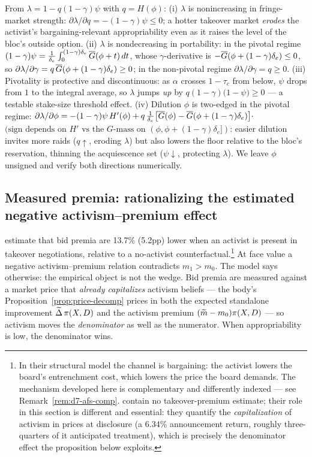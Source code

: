 \begin{remark}
\label{rem:d7-compstat}
From $\lambda=1-q(1-\gamma)\psi$ with $q=H(\phi)$:
(i) $\lambda$ is nonincreasing in fringe-market strength: $\partial\lambda/\partial q=-(1-\gamma)\psi\le0$; a hotter takeover market \emph{erodes} the activist's bargaining-relevant appropriability even as it raises the level of the bloc's outside option.
(ii) $\lambda$ is nondecreasing in portability: in the pivotal regime $(1-\gamma)\psi=\frac{1}{\delta_{e}}\int_{0}^{(1-\gamma)\delta_{e}}\overline{G}(\phi+t)\,dt$, whose $\gamma$-derivative is $-\overline{G}(\phi+(1-\gamma)\delta_{e})\le0$, so $\partial\lambda/\partial\gamma=q\,\overline{G}(\phi+(1-\gamma)\delta_{e})\ge0$; in the non-pivotal regime $\partial\lambda/\partial\gamma=q\ge0$.
(iii) Pivotality is protective and discontinuous: as $\alpha$ crosses $1-\tau_{c}$ from below, $\psi$ drops from $1$ to the integral average, so $\lambda$ jumps \emph{up} by $q(1-\gamma)\bigl(1-\psi\bigr)\ge0$ --- a testable stake-size threshold effect.
(iv) Dilution $\phi$ is two-edged in the pivotal regime: $\partial\lambda/\partial\phi=-(1-\gamma)\psi\,H'(\phi)+q\,\frac{1}{\delta_{e}}\bigl[\overline{G}(\phi)-\overline{G}(\phi+(1-\gamma)\delta_{e})\bigr]\cdot$ $(\text{sign depends on } H' \text{ vs the } G\text{-mass on }(\phi,\phi+(1-\gamma)\delta_{e}])$: easier dilution invites more raids ($q\uparrow$, eroding $\lambda$) but also lowers the floor relative to the bloc's reservation, thinning the acquiescence set ($\psi\downarrow$, protecting $\lambda$). We leave $\phi$ unsigned and verify both directions numerically.
\end{remark}

\subsection{Measured premia: rationalizing the estimated negative activism--premium effect}
\label{app:d7-afs}

\citet{CelentanoLevine2025} estimate that bid premia are 13.7\% (5.2pp) lower when an activist is present in takeover negotiations, relative to a no-activist counterfactual.\footnote{In their structural model the channel is bargaining: the activist lowers the board's entrenchment cost, which lowers the price the board demands. The mechanism developed here is complementary and differently indexed --- see Remark~\ref{rem:d7-afs-comp}. \citet{AlbuquerqueFosSchroth2022} contain no takeover-premium estimate; their role in this section is different and essential: they quantify the \emph{capitalization} of activism in prices at disclosure (a 6.34\% announcement return, roughly three-quarters of it anticipated treatment), which is precisely the denominator effect the proposition below exploits.} At face value a negative activism--premium relation contradicts $m_{1}>m_{0}$. The model says otherwise: the empirical object is not the wedge. Bid premia are measured against a market price that \emph{already capitalizes} activism beliefs --- the body's Proposition~\ref{prop:price-decomp} prices in both the expected standalone improvement $\widetilde{\Delta}\,\pi(X,D)$ and the activism premium $(\widetilde{m}-m_{0})\pi(X,D)$ --- so activism moves the \emph{denominator} as well as the numerator. When appropriability is low, the denominator wins.

